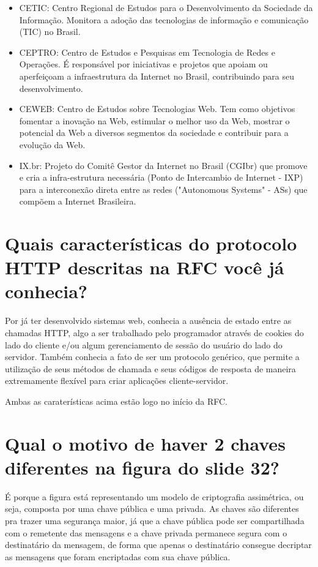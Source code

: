 \documentclass{article}
\begin{document}
\begin{itemize}
    \item CETIC: Centro Regional de Estudos para o Desenvolvimento da Sociedade da Informação. Monitora a adoção das tecnologias de informação e comunicação (TIC) no Brasil.

    \item CEPTRO: Centro de Estudos e Pesquisas em Tecnologia de Redes e Operações. É responsável por iniciativas e projetos que apoiam ou aperfeiçoam a infraestrutura da Internet no Brasil, contribuindo para seu desenvolvimento.

    \item CEWEB:  Centro de Estudos sobre Tecnologias Web. Tem como objetivos fomentar a inovação na Web, estimular o melhor uso da Web, mostrar o potencial da Web a diversos segmentos da sociedade e contribuir para a evolução da Web.

    \item IX.br: Projeto do Comitê Gestor da Internet no Brasil (CGIbr) que promove e cria a infra-estrutura necessária (Ponto de Intercambio de Internet - IXP) para a interconexão direta entre as redes ("Autonomous Systems" - ASs) que compõem a Internet Brasileira. 

\end{itemize}

\section{Quais características do protocolo HTTP descritas na RFC você já conhecia?}

Por já ter desenvolvido sistemas web, conhecia a ausência de estado entre as chamadas HTTP, algo a ser trabalhado pelo programador através de cookies do lado do cliente e/ou algum gerenciamento de sessão do usuário do lado do servidor. Também conhecia a fato de ser um protocolo genérico, que permite a utilização de seus métodos de chamada e seus códigos de resposta de maneira extremamente flexível para criar aplicações cliente-servidor. 

Ambas as caraterísticas acima estão logo no início da RFC.

\section{Qual o motivo de haver 2 chaves diferentes na figura do slide 32?}
É porque a figura está representando um modelo de criptografia assimétrica, ou seja, composta por uma chave pública e uma privada. As chaves são diferentes pra trazer uma segurança maior, já que a chave pública pode ser compartilhada com o remetente das mensagens e a chave privada permanece segura com o destinatário da mensagem, de forma que apenas o destinatário consegue decriptar as mensagens que foram encriptadas com sua chave pública.
\end{document}
